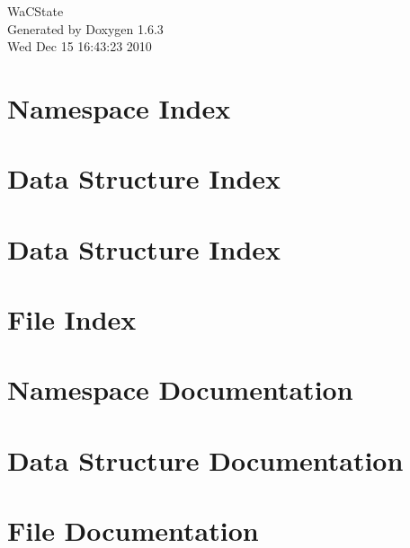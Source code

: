 \documentclass[a4paper]{book}
\begin{document}
\hypersetup{pageanchor=false}
\begin{titlepage}
\vspace*{7cm}
\begin{center}
{\Large WaCState }\\
\vspace*{1cm}
{\large Generated by Doxygen 1.6.3}\\
\vspace*{0.5cm}
{\small Wed Dec 15 16:43:23 2010}\\
\end{center}
\end{titlepage}
\clearemptydoublepage
{}
\tableofcontents
\clearemptydoublepage
{}
\hypersetup{pageanchor=true}
\chapter{Namespace Index}

\chapter{Data Structure Index}

\chapter{Data Structure Index}

\chapter{File Index}

\chapter{Namespace Documentation}






\chapter{Data Structure Documentation}








\chapter{File Documentation}








\printindex
\end{document}
